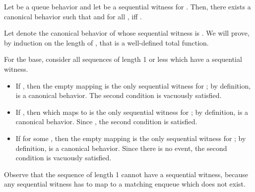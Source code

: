 \documentclass{LMCS}
\newcommand\mylabel[1]{\label{#1}}
\begin{document}
\begin{lem}\mylabel{lem:seqwit-canonical}
Let  be a queue behavior and let  be a sequential witness for .
Then, there exists a canonical behavior  such that  and for all ,  iff .
\end{lem}
\proof
Let  denote the canonical behavior of  whose sequential witness is .
We will prove, by induction on the length of , that  is a well-defined total function.

For the base, consider all sequences  of length 1 or less which have a sequential witness.
\begin{itemize}
\item If , then the empty mapping is the only sequential witness for ; by definition,  is a canonical behavior.
The second condition is vacuously satisfied.
\item If , then  which maps  to  is the only sequential witness for ; by definition,  is a canonical behavior.
Since , the second condition is satisfied.
\item If  for some , then the empty mapping is the only sequential witness for ; by definition,  is a canonical behavior.
Since there is no  event, the second condition is vacuously satisfied.
\end{itemize}
Observe that the sequence  of length 1 cannot have a sequential witness, because any sequential witness has to map  to a matching enqueue which does not exist.
\end{document}
